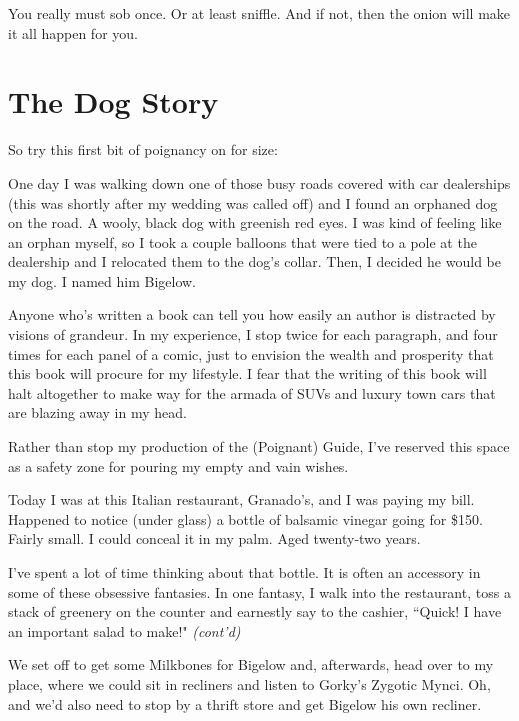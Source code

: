 \documentclass[10pt,twoside]{report}
\begin{document}
You really must sob once.  Or at least sniffle.  And if not, then the
onion will make it all happen for you.


\section{The Dog Story}


So try this first bit of poignancy on for size:

One day I was walking down one of those busy roads covered with car
dealerships (this was shortly after my wedding was called off) and I
found an orphaned dog on the road.  A wooly, black dog with greenish
red eyes.  I was kind of feeling like an orphan myself, so I took a
couple balloons that were tied to a pole at the dealership and I
relocated them to the dog's collar.  Then, I decided he would be my
dog.  I named him Bigelow.

	\begin{sidebar}
	Anyone who's written a book can tell you how easily an author is distracted by visions of grandeur. In my experience, I stop twice for each paragraph, and four times for each panel of a comic, just to envision the wealth and prosperity that this book will procure for my lifestyle. I fear that the writing of this book will halt altogether to make way for the armada of SUVs and luxury town cars that are blazing away in my head.\vspace{6pt}

	Rather than stop my production of the (Poignant) Guide, I've reserved this space as a safety zone for pouring my empty and vain wishes.\vspace{6pt}

	Today I was at this Italian restaurant, Granado's, and I was paying my bill. Happened to notice (under glass) a bottle of balsamic vinegar going for \$150. Fairly small. I could conceal it in my palm. Aged twenty-two years.\vspace{6pt}

	I've spent a lot of time thinking about that bottle. It is often an accessory in some of these obsessive fantasies. In one fantasy, I walk into the restaurant, toss a stack of greenery on the counter and earnestly say to the cashier, ``Quick! I have an important salad to make!" \textit{(cont'd)}
	\end{sidebar}

We set off to get some Milkbones for Bigelow and, afterwards, head
over to my place, where we could sit in recliners and listen to
Gorky's Zygotic Mynci.  Oh, and we'd also need to stop by a thrift
store and get Bigelow his own recliner.
\end{document}
